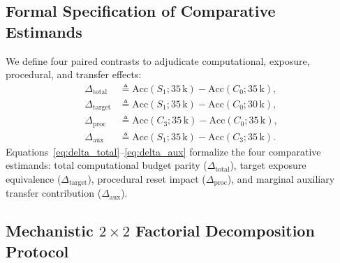 \documentclass[sn-mathphys,Numbered]{sn-jnl}
\begin{document}
\subsection{Formal Specification of Comparative Estimands}\label{subsec:schedule_estimands}

We define four paired contrasts to adjudicate computational, exposure, procedural, and transfer effects:
\begin{align}
    \Delta_{\mathrm{total}} &\triangleq \mathrm{Acc}(S_1; 35\,\mathrm{k}) - \mathrm{Acc}(C_0; 35\,\mathrm{k}), \label{eq:delta_total} \\
    \Delta_{\mathrm{target}} &\triangleq \mathrm{Acc}(S_1; 35\,\mathrm{k}) - \mathrm{Acc}(C_0; 30\,\mathrm{k}), \label{eq:delta_target} \\
    \Delta_{\mathrm{proc}} &\triangleq \mathrm{Acc}(C_3; 35\,\mathrm{k}) - \mathrm{Acc}(C_0; 35\,\mathrm{k}), \label{eq:delta_proc} \\
    \Delta_{\mathrm{aux}} &\triangleq \mathrm{Acc}(S_1; 35\,\mathrm{k}) - \mathrm{Acc}(C_3; 35\,\mathrm{k}). \label{eq:delta_aux}
\end{align}
Equations~\eqref{eq:delta_total}--\eqref{eq:delta_aux} formalize the four comparative estimands: total computational budget parity ($\Delta_{\mathrm{total}}$), target exposure equivalence ($\Delta_{\mathrm{target}}$), procedural reset impact ($\Delta_{\mathrm{proc}}$), and marginal auxiliary transfer contribution ($\Delta_{\mathrm{aux}}$).

\subsection{Mechanistic \texorpdfstring{$2 \times 2$}{2x2} Factorial Decomposition Protocol}\label{subsec:schedule_factorial}
\end{document}

